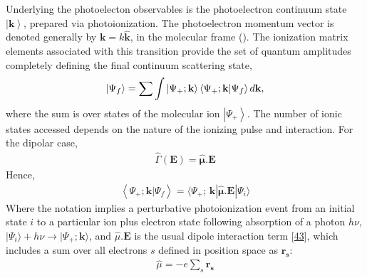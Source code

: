 \documentclass[letterpaper,table,10pt,english]{jupyterBook}
\begin{document}
\sphinxAtStartPar
Underlying the photoelecton observables is the photoelectron continuum state \(\left|\mathbf{k}\right>\), prepared via photoionization. The photoelectron momentum vector is denoted generally by
\(\boldsymbol{\mathbf{k}}=k\mathbf{\hat{k}}\), in the molecular frame ({\hyperref[\detokenize{backmatter/glossary:term-MF}]{}}). The ionization matrix elements associated with this transition provide the set of quantum amplitudes completely defining the final continuum scattering state,
\begin{equation}\label{equation:part1/theory_photoionization_dynamics_191122:eq:continuum-state-vec}
\begin{split}\left|\Psi_f\right> = \sum{\int{\left|\Psi_{+};\bf{k}\right>\left<\Psi_{+};\mathbf{k}|\Psi_f\right> d\bf{k}}},
\end{split}
\end{equation}
\sphinxAtStartPar
where the sum is over states of the molecular ion \(\left|\Psi_{+}\right>\). The number of ionic states accessed depends on the nature of the ionizing pulse and interaction. For the dipolar case,
\begin{equation}\label{equation:part1/theory_photoionization_dynamics_191122:eq:def-dipole-operator}
\begin{split}\hat{\Gamma}(\boldsymbol{\mathbf{E}}) = \hat{\boldsymbol{\mu}}.\boldsymbol{\mathbf{E}}\end{split}
\end{equation}
\sphinxAtStartPar
Hence,
\begin{equation}\label{equation:part1/theory_photoionization_dynamics_191122:eq:matE-dipole}
\begin{split}\left<\Psi_{+};\mathbf{k}|\Psi_f\right> =\langle\Psi_{+};\,\mathbf{k}|\hat{\boldsymbol{\mu}}.\boldsymbol{\mathbf{E}}|\Psi_{i}\rangle
\end{split}
\end{equation}
\sphinxAtStartPar
Where the notation implies a perturbative photoionization event from an initial state \(i\) to a particular ion plus electron state following absorption of a photon \(h\nu\), \(|\Psi_{i}\rangle+h\nu{\rightarrow}|\Psi_{+};\boldsymbol{\mathbf{k}}\rangle\), and \(\hat{\mu}.\boldsymbol{\mathbf{E}}\) is the usual dipole interaction term {[}\hyperlink{cite.backmatter/bibliography:id690}{43}{]}, which includes a sum over all electrons \(s\) defined in position space as \(\mathbf{r_{s}}\):
\begin{equation}\label{equation:part1/theory_photoionization_dynamics_191122:eq:dipole-operator}
\begin{split}\hat{\mu}=-e\sum_{s}\mathbf{r_{s}}
\end{split}
\end{equation}
\end{document}
